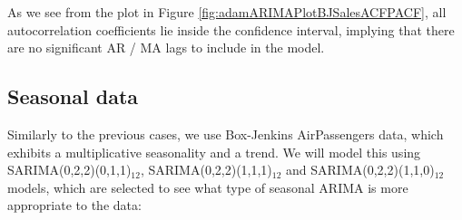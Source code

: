\documentclass[]{book}
\theoremstyle{definition}
\theoremstyle{definition}
\theoremstyle{definition}
\theoremstyle{definition}
\theoremstyle{remark}
\begin{document}
As we see from the plot in Figure \ref{fig:adamARIMAPlotBJSalesACFPACF}, all autocorrelation coefficients lie inside the confidence interval, implying that there are no significant AR / MA lags to include in the model.

\hypertarget{ARIMAExampleInRSeasonal}{%
\subsection{Seasonal data}\label{ARIMAExampleInRSeasonal}}

Similarly to the previous cases, we use Box-Jenkins AirPassengers data, which exhibits a multiplicative seasonality and a trend. We will model this using SARIMA(0,2,2)(0,1,1)\(_{12}\), SARIMA(0,2,2)(1,1,1)\(_{12}\) and SARIMA(0,2,2)(1,1,0)\(_{12}\) models, which are selected to see what type of seasonal ARIMA is more appropriate to the data:
\end{document}
